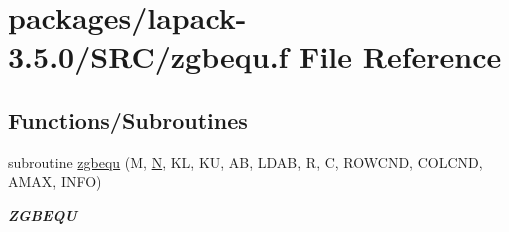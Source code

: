 \hypertarget{zgbequ_8f}{}\section{packages/lapack-\/3.5.0/\+S\+R\+C/zgbequ.f File Reference}
\label{zgbequ_8f}
\subsection*{Functions/\+Subroutines}
\begin{DoxyCompactItemize}
\item 
subroutine \hyperlink{group__complex16GBcomputational_gadc499be042b41eb62757b62dce1aa6d7}{zgbequ} (M, \hyperlink{polmisc_8c_a0240ac851181b84ac374872dc5434ee4}{N}, K\+L, K\+U, A\+B, L\+D\+A\+B, R, C, R\+O\+W\+C\+N\+D, C\+O\+L\+C\+N\+D, A\+M\+A\+X, I\+N\+F\+O)
\begin{DoxyCompactList}\small\item\em {\bfseries Z\+G\+B\+E\+Q\+U} \end{DoxyCompactList}\end{DoxyCompactItemize}
